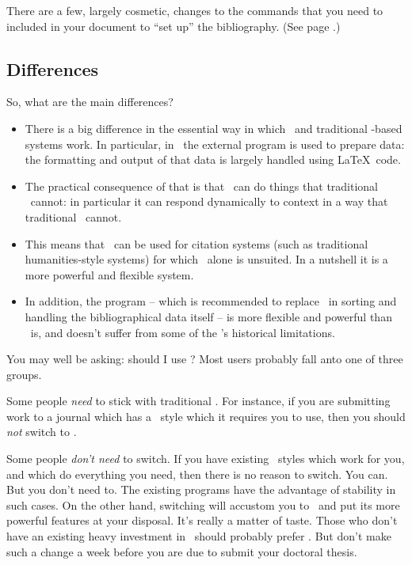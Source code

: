 There are a few, largely cosmetic, changes to the commands that you need to included in your document to ``set up'' the bibliography. (See page \pageref{bibtex:simple:eg}.)

\subsection{Differences}

So, what are the main differences?
\begin{itemize}
\item There is a big difference in the essential way in which \biblatex\ and traditional \bibtex-based systems work. In particular, in \biblatex\ the external program is used to prepare data: the formatting and output of that data is largely handled using \LaTeX\ code.
\item The practical consequence of that is that \biblatex\ can do things that traditional \bibtex\ cannot: in particular it can respond dynamically to context in a way that traditional \bibtex\ cannot.
\item This means that \biblatex\ can be used for citation systems (such as traditional humanities-style systems) for which \bibtex\ alone is unsuited. In a nutshell it is a more powerful and flexible system.
\item In addition, the  program -- which is recommended to replace \bibtex\ in sorting and handling the bibliographical data itself -- is more flexible and powerful than \bibtex\ is, and doesn't suffer from some of the \bibtex's historical limitations.
\end{itemize}

You may well be asking: should I use \biblatex? Most users probably fall anto one of three groups.

Some people \emph{need} to stick with traditional \bibtex. For instance, if you are submitting work to a journal which has a \bibtex\ style which it requires you to use, then you should \emph{not} switch to \biblatex.

Some people \emph{don't need} to switch. If you have existing \bibtex\ styles which work for you, and which do everything you need, then there is no reason to switch. You can. But you don't need to. The existing programs have the advantage of stability in such cases. On the other hand, switching will accustom you to \biblatex\ and put its more powerful features at your disposal. It's really a matter of taste. Those who don't have an existing heavy investment in \bibtex\ should probably prefer \bibtex. But don't make such a change a week before you are due to submit your doctoral thesis.

